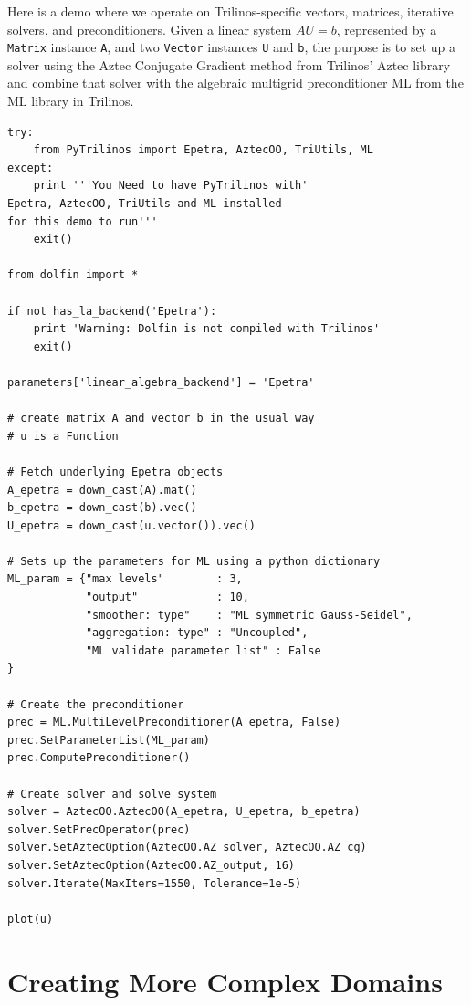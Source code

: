 Here is a demo where we operate on Trilinos-specific vectors, matrices,
iterative solvers, and preconditioners. Given a linear system
$AU=b$, represented by a {\fontsize{12pt}{12pt}\texttt{Matrix}} instance {\fontsize{12pt}{12pt}\texttt{A}},
and two {\fontsize{12pt}{12pt}\texttt{Vector}} instances {\fontsize{12pt}{12pt}\texttt{U}} and {\fontsize{12pt}{12pt}\texttt{b}}, the purpose is to
set up a solver using the Aztec Conjugate Gradient method from
Trilinos' Aztec library and combine that solver with the
algebraic multigrid preconditioner ML
from the ML library in Trilinos.
\begin{Verbatim}[fontsize=\fontsize{10pt}{10pt},tabsize=8,baselinestretch=1.05,
fontfamily=tt,xleftmargin=7mm]
try:
    from PyTrilinos import Epetra, AztecOO, TriUtils, ML
except:
    print '''You Need to have PyTrilinos with'
Epetra, AztecOO, TriUtils and ML installed
for this demo to run'''
    exit()

from dolfin import *

if not has_la_backend('Epetra'):
    print 'Warning: Dolfin is not compiled with Trilinos'
    exit()

parameters['linear_algebra_backend'] = 'Epetra'

# create matrix A and vector b in the usual way
# u is a Function

# Fetch underlying Epetra objects
A_epetra = down_cast(A).mat()
b_epetra = down_cast(b).vec()
U_epetra = down_cast(u.vector()).vec()

# Sets up the parameters for ML using a python dictionary
ML_param = {"max levels"        : 3,
            "output"            : 10,
            "smoother: type"    : "ML symmetric Gauss-Seidel",
            "aggregation: type" : "Uncoupled",
            "ML validate parameter list" : False
}

# Create the preconditioner
prec = ML.MultiLevelPreconditioner(A_epetra, False)
prec.SetParameterList(ML_param)
prec.ComputePreconditioner()

# Create solver and solve system
solver = AztecOO.AztecOO(A_epetra, U_epetra, b_epetra)
solver.SetPrecOperator(prec)
solver.SetAztecOption(AztecOO.AZ_solver, AztecOO.AZ_cg)
solver.SetAztecOption(AztecOO.AZ_output, 16)
solver.Iterate(MaxIters=1550, Tolerance=1e-5)

plot(u)
\end{Verbatim}
\noindent



\section{Creating More Complex Domains}
\label{langtangen:prepro}

